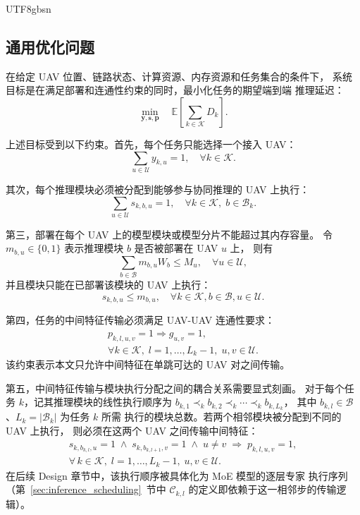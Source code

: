 \documentclass[conference]{IEEEtran}
\begin{document}
\begin{CJK*}{UTF8}{gbsn}
\subsection{通用优化问题}

在给定 UAV 位置、链路状态、计算资源、内存资源和任务集合的条件下，
系统目标是在满足部署和连通性约束的同时，最小化任务的期望端到端
推理延迟：
\begin{equation}
\min_{\mathbf{y},\mathbf{s},\mathbf{p}}
\quad
\mathbb{E}\left[\sum_{k\in\mathcal{K}} D_k\right].
\end{equation}

上述目标受到以下约束。首先，每个任务只能选择一个接入 UAV：
\begin{equation}
\sum_{u\in\mathcal{U}} y_{k,u}=1,\quad \forall k\in\mathcal{K}.
\end{equation}

其次，每个推理模块必须被分配到能够参与协同推理的 UAV 上执行：
\begin{equation}
\sum_{u\in\mathcal{U}} s_{k,b,u}=1,\quad
\forall k\in\mathcal{K},\; b\in\mathcal{B}_k.
\end{equation}

第三，部署在每个 UAV 上的模型模块或模型分片不能超过其内存容量。
令 $m_{b,u}\in\{0,1\}$ 表示推理模块 $b$ 是否被部署在 UAV $u$ 上，
则有
\begin{equation}
\sum_{b\in\mathcal{B}} m_{b,u}W_b \le M_u,\quad
\forall u\in\mathcal{U},
\end{equation}
并且模块只能在已部署该模块的 UAV 上执行：
\begin{equation}
s_{k,b,u}\le m_{b,u},\quad
\forall k\in\mathcal{K}, b\in\mathcal{B}, u\in\mathcal{U}.
\end{equation}

第四，任务的中间特征传输必须满足 UAV-UAV 连通性要求：
\begin{multline}
p_{k,l,u,v}=1 \Rightarrow g_{u,v}=1,\\
\forall k\in\mathcal{K},\; l=1,\ldots,L_k-1,\; u,v\in\mathcal{U}.
\end{multline}
该约束表示本文只允许中间特征在单跳可达的 UAV 对之间传输。

第五，中间特征传输与模块执行分配之间的耦合关系需要显式刻画。
对于每个任务 $k$，记其推理模块的线性执行顺序为
$b_{k,1} \prec_k b_{k,2} \prec_k \cdots \prec_k b_{k,L_k}$，
其中 $b_{k,l}\in\mathcal{B}$、$L_k=|\mathcal{B}_k|$ 为任务 $k$ 所需
执行的模块总数。若两个相邻模块被分配到不同的 UAV 上执行，
则必须在这两个 UAV 之间传输中间特征：
\begin{multline}
s_{k,b_{k,l},u}=1 \;\land\; s_{k,b_{k,l+1},v}=1
\;\land\; u\neq v \;\Longrightarrow\; p_{k,l,u,v}=1,\\[2pt]
\forall\,k\in\mathcal{K},\; l=1,\ldots,L_k-1,\; u,v\in\mathcal{U}.
\label{eq:p_s_coupling}
\end{multline}
在后续 Design 章节中，该执行顺序被具体化为 MoE 模型的逐层专家
执行序列（第~\ref{sec:inference_scheduling}~节中 $\mathcal{C}_{k,l}$
的定义即依赖于这一相邻步的传输逻辑）。


\end{CJK*}
\end{document}
